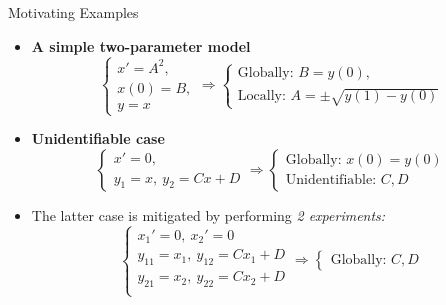 \documentclass[final,hyperref={pdfpagelabels=false}]{beamer}
\begin{document}
\begin{frame}[t]
\begin{columns}[t]
\begin{column}{.465\textwidth}
            \begin{block}{Motivating Examples}

                \begin{itemize}
                    \item {\bf A simple two-parameter model} \begin{equation}
                              \begin{cases}
                                  x' = A^2, \\
                                  x(0) = B, \\
                                  y = x
                              \end{cases}\Rightarrow\begin{cases}
                                  \text{Globally: } B=y(0), \\
                                  \text{Locally: }A=\pm\sqrt{y(1)-y(0)}
                              \end{cases}
                          \end{equation}
                    \item {\bf Unidentifiable case}\begin{equation}
                              \begin{cases}
                                  x' = 0, \\
                                  y_1 = x,~y_2=Cx+D
                              \end{cases}\Rightarrow\begin{cases}
                                  \text{Globally: } x(0)=y(0) \\
                                  \text{Unidentifiable: } C, D
                              \end{cases}
                          \end{equation}
                    \item The latter case is mitigated by performing \emph{2 experiments:}
                          \begin{equation}
                              \begin{cases}
                                  x_1' = 0,~x_2'=0            \\
                                  y_{11} = x_1,~y_{12}=Cx_1+D \\
                                  y_{21} = x_2,~y_{22}=Cx_2+D \\
                              \end{cases}\Rightarrow\begin{cases}
                                  \text{Globally: } C, D
                              \end{cases}
                          \end{equation}
                \end{itemize}


\end{block}
\end{column}
\end{columns}
\end{frame}
\end{document}
